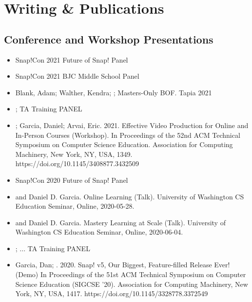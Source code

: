 \section{Writing \& Publications}
\vspace{6pt}

\subsection{Conference and Workshop Presentations}

\vspace{5pt}

\begin{itemize}

  \setlength\itemsep{1em}
    \item{Snap!Con 2021 Future of Snap! Panel}
    
    \item{Snap!Con 2021 BJC Middle School Panel}

    \item{Blank, Adam; Walther, Kendra; \me; Masters-Only BOF.
    Tapia 2021
    }

    \item{\me; TA Training PANEL}

    \item \me; Garcia, Daniel; Arvai, Eric. 2021. Effective Video Production for Online and In-Person Courses (Workshop). In Proceedings of the 52nd ACM Technical Symposium on Computer Science Education. Association for Computing Machinery, New York, NY, USA, 1349. https://doi.org/10.1145/3408877.3432509
    
    \item{Snap!Con 2020 Future of Snap! Panel}
    
    \item{\me and Daniel D. Garcia. Online Learning (Talk). University of Washington CS Education Seminar, Online, 2020-05-28.}
    
    \item{\me and Daniel D. Garcia. Mastery Learning at Scale (Talk). University of Washington CS Education Seminar, Online, 2020-06-04.}
    
    \item{\me; ... TA Training PANEL}
    
    \item{Garcia, Dan; \me. 2020. Snap! v5, Our Biggest, Feature-filled Release Ever! (Demo) In Proceedings of the 51st ACM Technical Symposium on Computer Science Education (SIGCSE '20). Association for Computing Machinery, New York, NY, USA, 1417. https://doi.org/10.1145/3328778.3372549}
    

\end{itemize}
